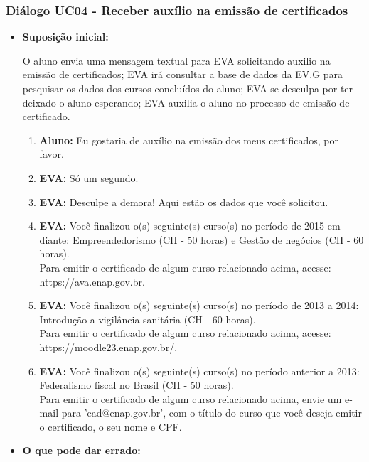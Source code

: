 \subsubsection{Diálogo UC04 - Receber auxílio na emissão de certificados}

\begin{itemize}
    \item \textbf{Suposição inicial:}
    
        O aluno envia uma mensagem textual para EVA solicitando auxilio na emissão de certificados; EVA irá consultar a base de dados da EV.G para pesquisar os dados dos cursos concluídos do aluno; EVA se desculpa por ter deixado o aluno esperando; EVA auxilia o aluno no processo de emissão de certificado.
        
        \begin{enumerate}
            \item \textbf{Aluno:} Eu gostaria de auxílio na emissão dos meus certificados, por favor.
            \item \textbf{EVA:} Só um segundo.
            \item \textbf{EVA:} Desculpe a demora! Aqui estão os dados que você solicitou.
            \item \textbf{EVA:} Você finalizou o(s) seguinte(s) curso(s) no período de 2015 em diante: Empreendedorismo (CH - 50 horas) e Gestão de negócios (CH - 60 horas). \\
            Para emitir o certificado de algum curso relacionado acima, acesse: https://ava.enap.gov.br.
            \item \textbf{EVA:} Você finalizou o(s) seguinte(s) curso(s) no período de 2013 a 2014: Introdução a vigilância sanitária (CH - 60 horas). \\
            Para emitir o certificado de algum curso relacionado acima, acesse: https://moodle23.enap.gov.br/.
            \item \textbf{EVA:} Você finalizou o(s) seguinte(s) curso(s) no período anterior a 2013: Federalismo fiscal no Brasil (CH - 50 horas). \\
            Para emitir o certificado de algum curso relacionado acima, envie um e-mail para 'ead@enap.gov.br', com o título do curso que você deseja emitir o certificado, o seu nome e CPF.
        \end{enumerate}
    
    \item \textbf{O que pode dar errado:}
    

\end{itemize}

